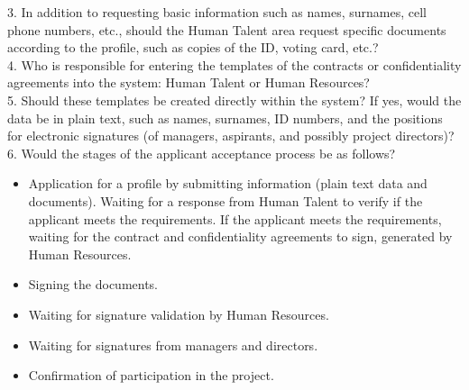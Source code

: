 \documentclass{scrreprt}
\begin{document}
3. In addition to requesting basic information such as names, surnames, cell phone numbers, etc., should the Human Talent area request specific documents according to the profile, such as copies of the ID, voting card, etc.?\\

4. Who is responsible for entering the templates of the contracts or confidentiality agreements into the system: Human Talent or Human Resources?\\

5. Should these templates be created directly within the system? If yes, would the data be in plain text, such as names, surnames, ID numbers, and the positions for electronic signatures (of managers, aspirants, and possibly project directors)?\\

6. Would the stages of the applicant acceptance process be as follows?
\begin{itemize}
    \item Application for a profile by submitting information (plain text data and documents).
    Waiting for a response from Human Talent to verify if the applicant meets the requirements.
    If the applicant meets the requirements, waiting for the contract and confidentiality agreements to sign, generated by Human Resources.
    \item Signing the documents.
    \item  Waiting for signature validation by Human Resources.
    \item  Waiting for signatures from managers and directors.
    \item Confirmation of participation in the project.
\end{itemize}
\end{document}
